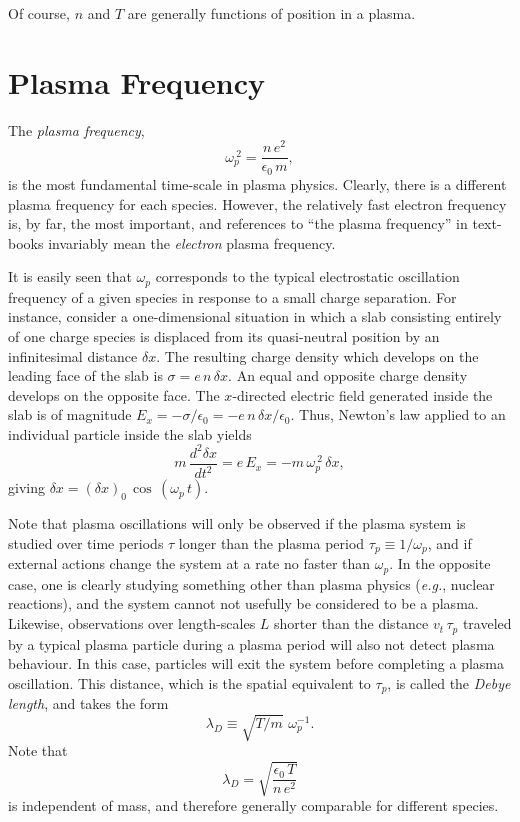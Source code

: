 Of course, $n$ and $T$ are generally functions of position in a plasma.

\section{Plasma Frequency}\label{s1.5}
The {\em plasma frequency},
\begin{equation}\label{e1.5}
\omega_p^{~2} = \frac{n\,e^2}{\epsilon_0\,m},
\end{equation}
is the most fundamental time-scale in plasma physics. Clearly, there is a
different plasma frequency for each species. However, the relatively
fast electron frequency is, by far,  the most important, and references
to ``the plasma frequency'' in text-books invariably mean the {\em electron}\/ plasma
frequency.

It is easily seen that $\omega_p$ corresponds to the typical electrostatic
oscillation frequency of a given species in response to a small charge separation. 
For instance, consider a one-dimensional situation in which a slab 
consisting entirely of one charge species is displaced from its
quasi-neutral position by an infinitesimal distance $\delta x$. The
resulting charge density which develops on the  leading face of the slab is
$\sigma=e\,n\,\delta x$. An equal and opposite charge density develops on the
opposite face. 
The $x$-directed electric field generated inside
the slab is of magnitude $E_x= -\sigma/\epsilon_0 =- e\,n\,\delta x/\epsilon_0$.
Thus, Newton's law applied to an individual particle inside the slab yields
\begin{equation}
m\,\frac{d^2 \delta x}{dt^2} = e\,E_x = -m\,\omega_p^{~2}\,\delta x,
\end{equation}
giving $\delta x = (\delta x)_0\,\cos\,(\omega_p\,t)$.

Note that plasma oscillations will only be observed if the plasma system
is studied  over time periods $\tau$ longer than the plasma period
$\tau_p\equiv 1/\omega_p$, and if external actions change the system at
a rate no faster than $\omega_p$. In the opposite case, one is clearly studying
something other than plasma physics ({\em e.g.}, nuclear reactions), and the
system cannot  not usefully be considered to be a plasma. Likewise, observations
over length-scales $L$ shorter than the distance $v_t\,\tau_p$ traveled
by a typical plasma particle during a plasma period will also not
detect plasma behaviour. In this case, particles will exit the
system before completing a plasma oscillation. This distance, which is the
spatial equivalent to $\tau_p$, is called the {\em Debye length}, and takes
the form
\begin{equation}
\lambda_D \equiv \sqrt{T/m}\,\,\omega_p^{-1}.
\end{equation}
Note that
\begin{equation}\label{e1.8}
\lambda_D = \sqrt{\frac{\epsilon_0\,T}{n\,e^2}}
\end{equation}
is independent of mass, and therefore generally comparable for different
species. 

